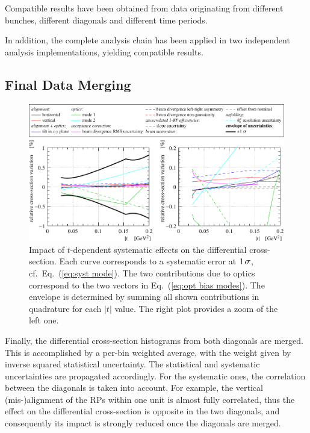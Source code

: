 Compatible results have been obtained from data originating from different bunches, different diagonals and different time periods.

In addition, the complete analysis chain has been applied in two independent analysis implementations, yielding compatible results.


\subsection{Final Data Merging}
\label{sec:final data merging}

\begin{figure}[ht]
\begin{center}
\includegraphics{fig/direct_method_mode_cmp_presentation.pdf}
\vskip-3mm
\caption{%
Impact of $t$-dependent systematic effects on the differential cross-section. Each curve corresponds to a systematic error at $1\,{\rm \sigma}$, cf.~Eq.~(\ref{eq:syst mode}).
The two contributions due to optics correspond to the two vectors in Eq.~(\ref{eq:opt bias modes}).
The envelope is determined by summing all shown contributions in quadrature for each $|t|$ value.
The right plot provides a zoom of the left one.
}
\label{fig:syst unc}
\end{center}
\end{figure}

Finally, the differential cross-section histograms from both diagonals are merged. This is accomplished by a per-bin weighted average, with the weight given by inverse squared statistical uncertainty. The statistical and systematic uncertainties are propagated accordingly. For the systematic ones, the correlation between the diagonals is taken into account. For example, the vertical (mis-)alignment of the RPs within one unit is almost fully correlated, thus the effect on the differential cross-section is opposite in the two diagonals, and consequently its impact is strongly reduced once the diagonals are merged.

